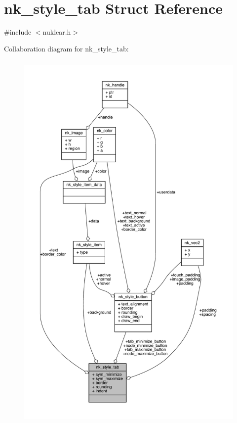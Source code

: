 \hypertarget{structnk__style__tab}{}\section{nk\+\_\+style\+\_\+tab Struct Reference}
\label{structnk__style__tab}


{\ttfamily \#include $<$nuklear.\+h$>$}



Collaboration diagram for nk\+\_\+style\+\_\+tab\+:
\nopagebreak
\begin{figure}[H]
\begin{center}
\leavevmode
\includegraphics[height=550pt]{structnk__style__tab__coll__graph}
\end{center}
\end{figure}
